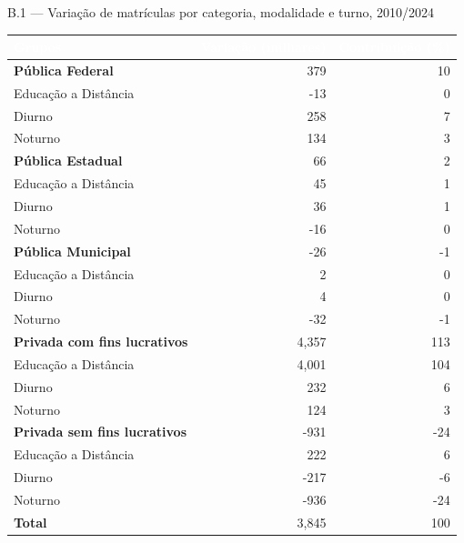 \documentclass[
  12pt,
  ignorenonframetext,
  aspectratio=169,
  brazilian,
  t]{beamer}
\newcommand{\TituloGrafico}[1]{{\fontsize{17.5}{21}\selectfont #1}}
\begin{document}
\begin{frame}{\TituloGrafico{B.1 --- Variação de matrículas por categoria, modalidade e turno,
2010/2024}}
\protect{}\label{b.1-variauxe7uxe3o-de-matruxedculas-por-categoria-modalidade-e-turno-20102024}
\begin{center}\begingroup\fontsize{10.5}{12}\selectfont

\begin{tabular}{p{}rr}
\toprule
\rowcolor{azulescuro}
\textcolor{white}{\textbf{Grupos}} & \textcolor{white}{\textbf{Variação (milhares)}} & \textcolor{white}{\textbf{Contribuição (\%)}}\\
\midrule
\rowcolor{cinzaclaro}\textbf{Pública Federal} & 379 & 10\\
\hspace{1em}Educação a Distância & -13 & 0\\
\hspace{1em}Diurno & 258 & 7\\
\hspace{1em}Noturno & 134 & 3\\
\rowcolor{cinzaclaro}\textbf{Pública Estadual} & 66 & 2\\
\hspace{1em}Educação a Distância & 45 & 1\\
\hspace{1em}Diurno & 36 & 1\\
\hspace{1em}Noturno & -16 & 0\\
\rowcolor{cinzaclaro}\textbf{Pública Municipal} & -26 & -1\\
\hspace{1em}Educação a Distância & 2 & 0\\
\hspace{1em}Diurno & 4 & 0\\
\hspace{1em}Noturno & -32 & -1\\
\rowcolor{cinzaclaro}\textbf{Privada com fins lucrativos} & 4,357 & 113\\
\hspace{1em}Educação a Distância & 4,001 & 104\\
\hspace{1em}Diurno & 232 & 6\\
\hspace{1em}Noturno & 124 & 3\\
\rowcolor{cinzaclaro}\textbf{Privada sem fins lucrativos} & -931 & -24\\
\hspace{1em}Educação a Distância & 222 & 6\\
\hspace{1em}Diurno & -217 & -6\\
\hspace{1em}Noturno & -936 & -24\\
\rowcolor{cinzaclaro}\textbf{Total} & 3,845 & 100\\
\bottomrule
\end{tabular}
\endgroup\end{center}


\end{frame}
\end{document}

